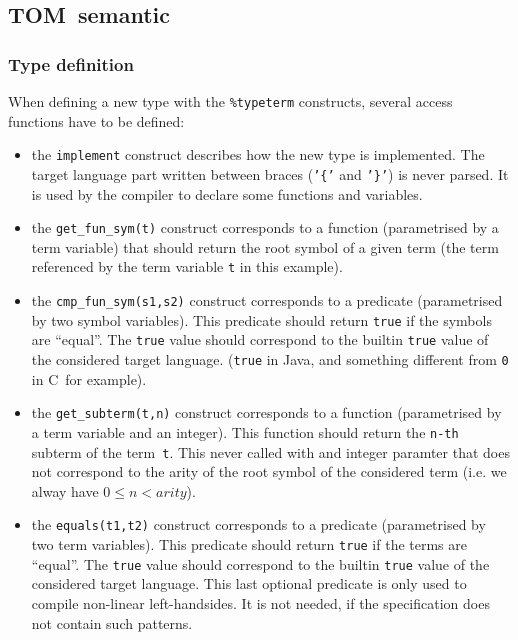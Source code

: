 \documentclass[a4paper]{article}
\newcommand{\TOM}{\textsf{TOM}}
\newcommand{\C}{\textsf{C}}
\newcommand{\Java}{\textsf{Java}}
\begin{document}
\subsection{\TOM\ semantic}

\subsubsection{Type definition}

\noindent
When defining a new type with the \texttt{\%typeterm} constructs,
several access functions have to be defined:
\begin{itemize}
\item the \texttt{implement} construct describes how the new type is 
  implemented. The target language part written between braces
  (\texttt{'\{'} and \texttt{'\}'}) is never parsed. It is used by
  the compiler to declare some functions and variables.

\item the \texttt{get\_fun\_sym(t)} construct corresponds to a
  function (parametrised by a term variable) that should return the
  root symbol of a given term (the term referenced by the term
  variable \texttt{t} in this example). 

\item the \texttt{cmp\_fun\_sym(s1,s2)} construct corresponds to a
  predicate (parametrised by two symbol variables).
  This predicate should return \texttt{true} if the symbols are
  ``equal''. The \texttt{true} value should correspond to the 
  builtin \texttt{true} value of the considered target language.
  (\texttt{true} in \Java, and something different from \texttt{0} in
  \C\ for example). 

\item the \texttt{get\_subterm(t,n)} construct corresponds to a
  function (parametrised by a term variable and an integer).
  This function should return the \texttt{n-th} subterm of the
  term~\texttt{t}. This never called with and integer paramter that
  does not correspond to the arity of the root symbol of the
  considered term (i.e. we alway have $0 \leq n < arity$).

\item the \texttt{equals(t1,t2)} construct corresponds to a
  predicate (parametrised by two term variables).
  This predicate should return \texttt{true} if the terms are
  ``equal''. The \texttt{true} value should correspond to the 
  builtin \texttt{true} value of the considered target language.
  This last optional predicate is only used to compile non-linear 
  left-handsides. It is not needed, if the specification does not
  contain such patterns.
\end{itemize}
\end{document}
